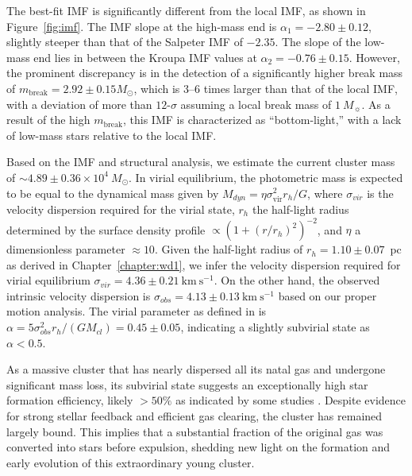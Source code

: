 \documentclass[12pt]{ucsddissertation}
\begin{document}
\begin{CJK*}{UTF8}{gbsn}
The best-fit IMF is significantly different from the local IMF, as shown in Figure~\ref{fig:imf}. The IMF slope at the high-mass end is $\alpha_1 = -2.80 \pm 0.12$, slightly steeper than that of the Salpeter IMF of $-2.35$. The slope of the low-mass end lies in between the Kroupa IMF values at $\alpha_2 = -0.76 \pm 0.15$. However, the prominent discrepancy is in the detection of a significantly higher break mass of $m_\mathrm{break}=2.92 \pm 0.15M_{\odot}$, which is $3$--$6$ times larger than that of the local IMF, with a deviation of more than $12$-$\sigma$ assuming a local break mass of $1~M_\sun$. As a result of the high $m_\mathrm{break}$, this IMF is characterized as “bottom-light,” with a lack of low-mass stars relative to the local IMF. 

Based on the IMF and structural analysis, we estimate the current cluster mass of $\sim 4.89 \pm 0.36 \times 10^4~M_\odot$. In virial equilibrium, the photometric mass is expected to be equal to the dynamical mass given by $M_{dyn}=\eta \sigma_\mathrm{vir}^2 r_h / G$, where $\sigma_{vir}$ is the velocity dispersion required for the virial state, $r_h$ the half-light radius determined by the surface density profile $\propto(1 + (r/r_h)^2)^{-2}$, and $\eta$ a dimensionless parameter $\approx10$. Given the half-light radius of $r_h = 1.10 \pm 0.07$~pc as derived in Chapter~\ref{chapter:wd1}, we infer the velocity dispersion required for virial equilibrium $\sigma_{vir} = 4.36 \pm 0.21~\mathrm{km}~\mathrm{s}^{-1}$. On the other hand, the observed intrinsic velocity dispersion is $\sigma_{obs} = 4.13 \pm 0.13~\mathrm{km}~\mathrm{s}^{-1}$  based on our proper motion analysis. The virial parameter as defined in \citet{Bertoldi-1992} is $\alpha = 5\sigma_{obs}^2r_h/(GM_{cl}) = 0.45 \pm 0.05$, indicating a slightly subvirial state as $\alpha < 0.5$. 

As a massive cluster that has nearly dispersed all its natal gas and undergone significant mass loss, its subvirial state suggests an exceptionally high star formation efficiency, likely $> 50\%$ as indicated by some studies \citep[][]{Geyer-2001, Li-2019}. Despite evidence for strong stellar feedback and efficient gas clearing, the cluster has remained largely bound. This implies that a substantial fraction of the original gas was converted into stars before expulsion, shedding new light on the formation and early evolution of this extraordinary young cluster.


\end{CJK*}
\end{document}
